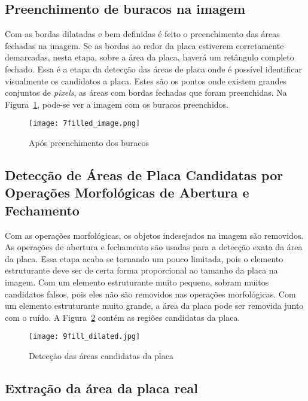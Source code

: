 \subsection{Preenchimento de buracos na imagem}

Com as bordas dilatadas e bem definidas é feito o preenchimento das áreas
fechadas na imagem. Se as bordas ao redor da placa estiverem corretamente
demarcadas, nesta etapa, sobre a área da placa, haverá um retângulo completo
fechado. Essa é a etapa da detecção das áreas de placa onde é possível
identificar visualmente os candidatos a placa. Estes são os pontos onde existem
grandes conjuntos de \emph{pixels}, as áreas com bordas fechadas que foram
preenchidas. Na Figura~\ref{fig:ext_holes_filled}, pode-se ver a imagem com os
buracos preenchidos.

\begin{figure}[H]
	\centering
	\texttt{[image: 7filled\_image.png]}
	\caption{Após preenchimento dos buracos}
	\label{fig:ext_holes_filled}
\end{figure}

\subsection{Detecção de Áreas de Placa Candidatas por Operações Morfológicas de Abertura e Fechamento}

Com as operações morfológicas, os objetos indesejados na imagem são removidos.
As operações de abertura e fechamento são usadas para a detecção exata da área
da placa. Essa etapa acaba se tornando um pouco limitada, pois o elemento
estruturante deve ser de certa forma proporcional ao tamanho da placa na imagem.
Com um elemento estruturante muito pequeno, sobram muitos candidatos falsos,
pois eles não são removidos nas operações morfológicas. Com um elemento
estruturante muito grande, a área da placa pode ser removida junto com o ruído.
A Figura~\ref{fig:ext_plate_area_detection} contém as regiões candidatas da
placa.

\begin{figure}[H]
	\centering
	\texttt{[image: 9fill\_dilated.jpg]}
	\caption{Detecção das áreas candidatas da placa}
	\label{fig:ext_plate_area_detection}
\end{figure}

\subsection{Extração da área da placa real}

